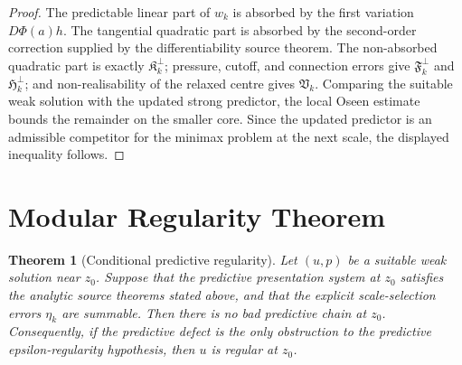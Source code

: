\documentclass[11pt]{article}
\newtheorem{theorem}{Theorem}[section]
\begin{document}
\begin{proof}
The predictable linear part of \(w_k\) is absorbed by the first variation
\(D\Phi(a)h\). The tangential quadratic part is absorbed by the second-order
correction supplied by the differentiability source theorem. The non-absorbed
quadratic part is exactly \(\mathfrak K_k^\perp\); pressure, cutoff, and
connection errors give \(\mathfrak F_k^\perp\) and \(\mathfrak H_k^\perp\); and
non-realisability of the relaxed centre gives \(\mathfrak V_k\). Comparing the
suitable weak solution with the updated strong predictor, the local Oseen
estimate bounds the remainder on the smaller core. Since the updated predictor
is an admissible competitor for the minimax problem at the next scale, the
displayed inequality follows.
\end{proof}

\section{Modular Regularity Theorem}

\begin{theorem}[Conditional predictive regularity]
Let \((u,p)\) be a suitable weak solution near \(z_0\). Suppose that the
predictive presentation system at \(z_0\) satisfies the analytic source theorems
stated above, and that the explicit scale-selection errors \(\eta_k\) are
summable. Then there is no bad predictive chain at \(z_0\). Consequently, if the
predictive defect is the only obstruction to the predictive epsilon-regularity
hypothesis, then \(u\) is regular at \(z_0\).
\end{theorem}
\end{document}
